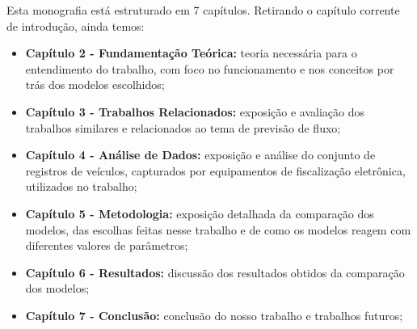 Esta monografia está estruturado em 7 capítulos. Retirando o capítulo corrente de introdução, ainda temos:

\begin{itemize}
    \item \textbf{Capítulo 2 - Fundamentação Teórica:} teoria necessária para o entendimento do trabalho, com foco no funcionamento e nos conceitos por trás dos modelos escolhidos;
    \item \textbf{Capítulo 3 - Trabalhos Relacionados:} exposição e avaliação dos trabalhos similares e relacionados ao tema de previsão de fluxo;
    \item \textbf{Capítulo 4 - Análise de Dados:} exposição e análise do conjunto de registros de veículos, capturados por equipamentos de fiscalização eletrônica, utilizados no trabalho;
    \item \textbf{Capítulo 5 - Metodologia:} exposição detalhada da comparação dos modelos, das escolhas feitas nesse trabalho e de como os modelos reagem com diferentes valores de parâmetros;
    \item \textbf{Capítulo 6 - Resultados:} discussão dos resultados obtidos da comparação dos modelos;
    \item \textbf{Capítulo 7 - Conclusão:} conclusão do nosso trabalho e trabalhos futuros;
\end{itemize}
